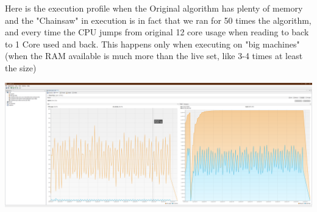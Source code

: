 \documentclass[a4paper,twoside]{article}
\begin{document}
Here is the execution profile when the Original algorithm has plenty of memory and the "Chainsaw" in execution is in fact that we ran for 50 times the algorithm, and every time the CPU jumps from original 12 core usage when reading to back to 1 Core used and back.
This happens only when executing on "big machines" (when the RAM available is much more than the live set, like 3-4 times at least the size)
\begin{center}
	\includegraphics[scale=0.065]{images/Visual_VM_Small_file_Original_execution_profile.png}
\end{center}
\end{document}
